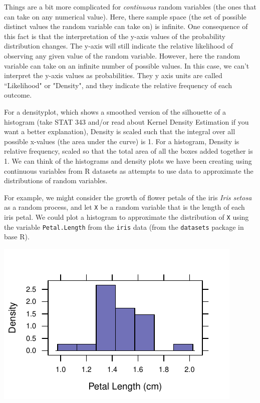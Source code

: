\documentclass[twoside]{book}\usepackage[]{graphicx}\usepackage[]{xcolor}
\makeatletter
\def\maxwidth{ %
  \ifdim\Gin@nat@width>\linewidth
    \linewidth
  \else
    \Gin@nat@width
  \fi
}
\newenvironment{knitrout}{}{} %
\newcommand{\Rindex}[1]{\index{\texttt{#1}}}
\newcommand{\dataframe}[1]{{\color{blue!80!black}\texttt{#1}}\Rindex{#1}}
\newcommand{\pkg}[1]{{\color{red!80!black}\texttt{#1}}\Rindex{#1}}
\newcounter{example}[section]
\makeatother
\begin{document}
Things are a bit more complicated for \emph{continuous} random variables (the ones that can take on any numerical value).  Here, there sample space (the set of possible distinct values the random variable can take on) is infinite.  One consequence of this fact is that the interpretation of the y-axis values of the probability distribution changes.  The y-axis will still indicate the relative likelihood of observing any given value of the random variable.  However, here the random variable can take on an infinite number of possible values.  In this case, we can't interpret the y-axis values as probabilities.  They y axis units are called ``Likelihood" or "Density", and they indicate the relative frequency of each outcome. 

For a densityplot, which shows a smoothed version of the silhouette of a histogram (take STAT 343 and/or read about Kernel Density Estimation if you want a better explanation), Density is scaled such that the integral over all possible x-values (the area under the curve) is 1. For a histogram, Density is relative frequency, scaled so that the total area of all the boxes added together is 1.  We can think of the histograms and density plots we have been creating using continuous variables from R datasets as attempts to use data to approximate the distributions of random variables.  

For example, we might consider the growth of flower petals of the iris \textit{Iris setosa} as a random process, and let \texttt{X} be a random variable that is the length of each iris petal.  We could plot a histogram to approximate the distribution of \texttt{X} using the variable \texttt{Petal.Length} from the \dataframe{iris} data (from the \pkg{datasets} package in base R).

\begin{knitrout}
\color{fgcolor}

{\centering \includegraphics[width=\maxwidth]{figures/fig-cont_pdf-1} 

}



\end{knitrout}
\end{document}
